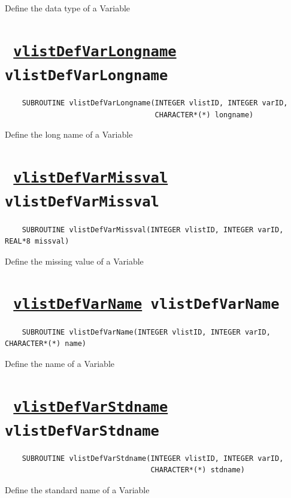 Define the data type of a Variable
\ifpdfoutput{}{(\ref{vlistDefVarDatatype})}


\section*{\texttt{ 
\ifpdf
\hyperref[vlistDefVarLongname]{vlistDefVarLongname}
\else
vlistDefVarLongname
\fi
}}
\begin{verbatim}
    SUBROUTINE vlistDefVarLongname(INTEGER vlistID, INTEGER varID, 
                                   CHARACTER*(*) longname)
\end{verbatim}

Define the long name of a Variable
\ifpdfoutput{}{(\ref{vlistDefVarLongname})}


\section*{\texttt{ 
\ifpdf
\hyperref[vlistDefVarMissval]{vlistDefVarMissval}
\else
vlistDefVarMissval
\fi
}}
\begin{verbatim}
    SUBROUTINE vlistDefVarMissval(INTEGER vlistID, INTEGER varID, REAL*8 missval)
\end{verbatim}

Define the missing value of a Variable
\ifpdfoutput{}{(\ref{vlistDefVarMissval})}


\section*{\texttt{ 
\ifpdf
\hyperref[vlistDefVarName]{vlistDefVarName}
\else
vlistDefVarName
\fi
}}
\begin{verbatim}
    SUBROUTINE vlistDefVarName(INTEGER vlistID, INTEGER varID, CHARACTER*(*) name)
\end{verbatim}

Define the name of a Variable
\ifpdfoutput{}{(\ref{vlistDefVarName})}


\section*{\texttt{ 
\ifpdf
\hyperref[vlistDefVarStdname]{vlistDefVarStdname}
\else
vlistDefVarStdname
\fi
}}
\begin{verbatim}
    SUBROUTINE vlistDefVarStdname(INTEGER vlistID, INTEGER varID, 
                                  CHARACTER*(*) stdname)
\end{verbatim}

Define the standard name of a Variable
\ifpdfoutput{}{(\ref{vlistDefVarStdname})}


